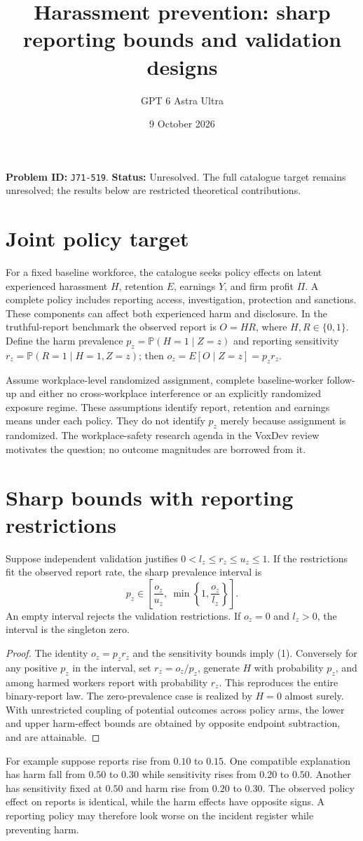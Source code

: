 \documentclass[11pt,a4paper]{article}
\title{Harassment prevention: sharp reporting bounds and validation designs}
\author{GPT 6 Astra Ultra}\date{9 October 2026}
\newcommand{\Prob}{\mathbb P}
\begin{document}
\maketitle
\textbf{Problem ID:} \texttt{J71-519}. \textbf{Status:} Unresolved. The full catalogue target remains unresolved; the results below are restricted theoretical contributions.

\section{Joint policy target}
For a fixed baseline workforce, the catalogue seeks policy effects on latent experienced harassment $H$, retention $E$, earnings $Y$, and firm profit $\Pi$. A complete policy includes reporting access, investigation, protection and sanctions. These components can affect both experienced harm and disclosure. In the truthful-report benchmark the observed report is $O=HR$, where $H,R\in\{0,1\}$. Define the harm prevalence $p_z=\Prob(H=1\mid Z=z)$ and reporting sensitivity $r_z=\Prob(R=1\mid H=1,Z=z)$; then $o_z=E[O\mid Z=z]=p_zr_z$.

Assume workplace-level randomized assignment, complete baseline-worker follow-up and either no cross-workplace interference or an explicitly randomized exposure regime. These assumptions identify report, retention and earnings means under each policy. They do not identify $p_z$ merely because assignment is randomized. The workplace-safety research agenda in the VoxDev review motivates the question; no outcome magnitudes are borrowed from it.

\section{Sharp bounds with reporting restrictions}
Suppose independent validation justifies $0<l_z\le r_z\le u_z\le1$. If the restrictions fit the observed report rate, the sharp prevalence interval is
\[
 p_z\in\left[\frac{o_z}{u_z},\ \min\left\{1,\frac{o_z}{l_z}\right\}\right].
\tag{1}
\]
An empty interval rejects the validation restrictions. If $o_z=0$ and $l_z>0$, the interval is the singleton zero.
\begin{proof}
The identity $o_z=p_zr_z$ and the sensitivity bounds imply (1). Conversely for any positive $p_z$ in the interval, set $r_z=o_z/p_z$, generate $H$ with probability $p_z$, and among harmed workers report with probability $r_z$. This reproduces the entire binary-report law. The zero-prevalence case is realized by $H=0$ almost surely. With unrestricted coupling of potential outcomes across policy arms, the lower and upper harm-effect bounds are obtained by opposite endpoint subtraction, and are attainable.
\end{proof}
For example suppose reports rise from $0.10$ to $0.15$. One compatible explanation has harm fall from $0.50$ to $0.30$ while sensitivity rises from $0.20$ to $0.50$. Another has sensitivity fixed at $0.50$ and harm rise from $0.20$ to $0.30$. The observed policy effect on reports is identical, while the harm effects have opposite signs. A reporting policy may therefore look worse on the incident register while preventing harm.
\end{document}

